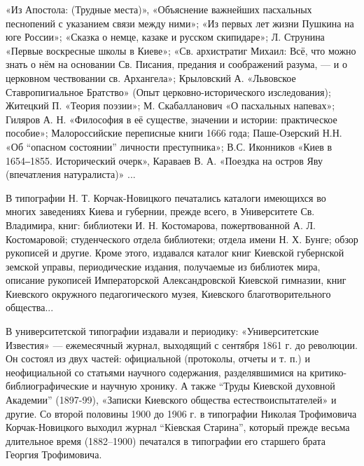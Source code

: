 «Из Апостола: (Трудные места)», «Объяснение важнейших пасхальных песнопений с
указанием связи между ними»; «Из первых лет жизни Пушкина на юге России»;
«Сказка о немце, казаке и русском скипидаре»; Л. Струнина «Первые воскресные
школы в Киеве»; «Св. архистратиг Михаил: Всё, что можно знать о нём на
основании Св. Писания, предания и соображений разума, — и о церковном
чествовании св. Архангела»; Крыловский А. «Львовское Ставропигиальное Братство»
(Опыт церковно-исторического изследования); Житецкий П. «Теория поэзии»; М.
Скабалланович «О пасхальных напевах»; Гиляров А. Н. «Философия в её существе,
значении и истории: практическое пособие»;  Малороссийские переписные книги
1666 года; Паше-Озерский Н.Н. «Об \enquote{опасном состоянии} личности преступника»;
В.С. Иконников «Киев в 1654‒1855. Исторический очерк», Караваев В. А. «Поездка
на остров Яву (впечатления натуралиста)» ...


В типографии Н. Т. Корчак-Новицкого печатались каталоги имеющихся во многих
заведениях Киева и губернии, прежде всего, в Университете Св. Владимира, книг:
библиотеки И. Н. Костомарова, пожертвованной А. Л. Костомаровой; студенческого
отдела библиотеки; отдела имени Н. Х. Бунге; обзор рукописей и другие. Кроме
этого, издавался каталог книг Киевской губернской земской управы, периодические
издания, получаемые из библиотек мира, описание рукописей Императорской
Александровской Киевской гимназии, книг Киевского окружного педагогического
музея, Киевского благотворительного общества...

В университетской типографии издавали и периодику: «Университетские Известия»
— ежемесячный журнал, выходящий с сентября 1861 г. до революции. Он состоял из
двух частей: официальной (протоколы, отчеты и т. п.) и неофициальной со
статьями научного содержания, разделявшимися на критико-библиографические и
научную хронику. А также \enquote{Труды Киевской духовной Академии} (1897-99), «Записки
Киевского общества естествоиспытателей» и другие. Со второй половины 1900 до
1906 г. в типографии Николая Трофимовича Корчак-Новицкого выходил журнал
\enquote{Кіевская Старина}, который прежде весьма длительное время (1882–1900)
печатался в типографии его старшего брата Георгия Трофимовича.

